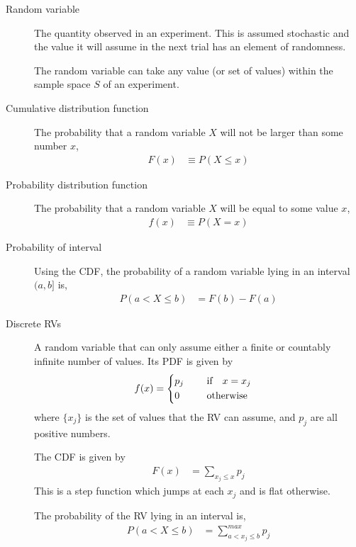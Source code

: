 \begin{description}
    \item[Random variable] The quantity observed in an experiment. This is assumed
          stochastic and the value it will assume in the next trial has an element of
          randomness. \par
          The random variable can take any value (or set of values) within the sample
          space $ S $ of an experiment.

    \item[Cumulative distribution function] The probability that a random variable
          $ X $ will not be larger than some number $ x $,
          \begin{align}
              F(x) & \equiv P(X \leq x)
          \end{align}

    \item[Probability distribution function] The probability that a random variable
          $ X $ will be equal to some value $ x $,
          \begin{align}
              f(x) & \equiv P(X = x)
          \end{align}

    \item[Probability of interval] Using the CDF, the probability of a random variable
          lying in an interval $ (a,b] $ is,
          \begin{align}
              P(a < X \leq b) & = F(b) - F(a)
          \end{align}

    \item[Discrete RVs] A random variable that can only assume either a finite or
          countably infinite number of values. Its PDF is given by
          \begin{align}
              f(x) & = \begin{dcases}
                           p_j & \quad\ \text{if}\quad  x = x_j \\
                           0   & \quad\ \text{otherwise}
                       \end{dcases}
          \end{align}
          where $ \{x_j\} $ is the set of values that the RV can assume, and $ p_j $
          are all positive numbers. \par
          The CDF is given by
          \begin{align}
              F(x) & = \sum_{x_j \leq x} p_j
          \end{align}
          This is a step function which jumps at each $ x_j $ and is flat otherwise. \par
          The probability of the RV lying in an interval is,
          \begin{align}
              P(a < X \leq b) & = \sum_{a < x_j \leq b}^{max} p_j
          \end{align}


\end{description}
